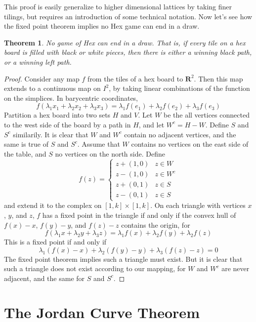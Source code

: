 \documentclass{article}
\theoremstyle{plain}
\newtheorem{theorem}{Theorem}
\begin{document}
This proof is easily generalize to higher dimensional lattices by taking finer tilings, but requires an introduction of some technical notation. Now let's see how the fixed point theorem implies no Hex game can end in a draw.

\begin{theorem}
    No game of Hex can end in a draw. That is, if every tile on a hex board is filled with black or white pieces, then there is either a winning black path, or a winning left path.
\end{theorem}
\begin{proof}
    Consider any map $f$ from the tiles of a hex board to $\mathbf{R}^2$. Then this map extends to a continuous map on $I^2$, by taking linear combinations of the function on the simplices. In barycentric coordinates,
    \[ f(\lambda_1 x_1 + \lambda_2 x_2 + \lambda_3 x_3) = \lambda_1 f(e_1) + \lambda_2 f(e_2) + \lambda_3 f(e_3) \]
    Partition a hex board into two sets $H$ and $V$. Let $W$ be the all vertices connected to the west side of the board by a path in $H$, and let $W^c = H - W$. Define $S$ and $S^c$ similarily. It is clear that $W$ and $W^c$ contain no adjacent vertices, and the same is true of $S$ and $S^c$. Assume that $W$ contains no vertices on the east side of the table, and $S$ no vertices on the north side. Define
    \[ f(z) = \begin{cases} z + (1,0) & z \in W \\ z - (1,0) & z \in W^c \\ z + (0,1) & z \in S \\ z - (0,1) & z \in S \end{cases} \]
    and extend it to the complex on $[1,k] \times [1,k]$. On each triangle with vertices $x$, $y$, and $z$, $f$ has a fixed point in the triangle if and only if the convex hull of $f(x) - x$, $f(y) - y$, and $f(z) - z$ contains the origin, for
    \[ f(\lambda_1 x + \lambda_2 y + \lambda_3 z) = \lambda_1 f(x) + \lambda_2 f(y) + \lambda_2 f(z) \]
    This is a fixed point if and only if
    \[ \lambda_1 (f(x) - x) + \lambda_2 (f(y) - y) + \lambda_3 (f(z) - z) = 0 \]
    The fixed point theorem implies such a triangle must exist. But it is clear that such a triangle does not exist according to our mapping, for $W$ and $W^c$ are never adjacent, and the same for $S$ and $S^c$.
\end{proof}

\section{The Jordan Curve Theorem}
\end{document}
